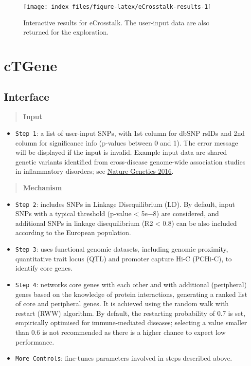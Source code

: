 \documentclass[
  oneside]{book}
\providecommand{\tightlist}{%
  \setlength{\itemsep}{0pt}\setlength{\parskip}{0pt}}
\begin{document}
\begin{figure}

{\centering \texttt{[image: index\_files/figure-latex/eCrosstalk-results-1]} 

}

\caption{Interactive results for eCrosstalk. The user-input data are also returned for the exploration.}\label{fig:eCrosstalk-results}
\end{figure}

\hypertarget{ctgene}{%
\chapter{cTGene}\label{ctgene}}

\hypertarget{interface-3}{%
\section{Interface}\label{interface-3}}

\begin{quote}
\textbf{Input}
\end{quote}

\begin{itemize}
\tightlist
\item
  \texttt{Step\ 1}: a list of user-input SNPs, with 1st column for dbSNP rsIDs and 2nd column for significance info (p-values between 0 and 1). The error message will be displayed if the input is invalid. Example input data are shared genetic variants identified from cross-disease genome-wide association studies in inflammatory disorders; see \href{https://www.ncbi.nlm.nih.gov/pubmed/26974007}{Nature Genetics 2016}.
\end{itemize}

\begin{quote}
\textbf{Mechanism}
\end{quote}

\begin{itemize}
\item
  \texttt{Step\ 2}: includes SNPs in Linkage Disequilibrium (LD). By default, input SNPs with a typical threshold (p-value \textless{} 5e−8) are considered, and additional SNPs in linkage disequilibrium (R2 \textless{} 0.8) can be also included according to the European population.
\item
  \texttt{Step\ 3}: uses functional genomic datasets, including genomic proximity, quantitative trait locus (QTL) and promoter capture Hi-C (PCHi-C), to identify core genes.
\item
  \texttt{Step\ 4}: networks core genes with each other and with additional (peripheral) genes based on the knowledge of protein interactions, generating a ranked list of core and peripheral genes. It is achieved using the random walk with restart (RWW) algorithm. By default, the restarting probability of 0.7 is set, empirically optimised for immune-mediated diseases; selecting a value smaller than 0.6 is not recommended as there is a higher chance to expect low performance.
\item
  \texttt{More\ Controls}: fine-tunes parameters involved in steps described above.
\end{itemize}
\end{document}
